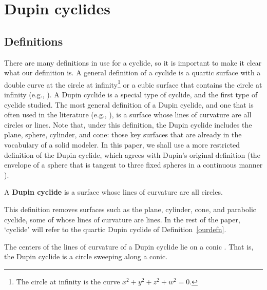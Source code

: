 \section{Dupin cyclides}
\label{sec-cy}

\subsection{Definitions}

There are many definitions in use for a cyclide,
so it is important to make it clear what our definition is.
A general definition of a cyclide is 
a quartic surface with a double curve at the circle at infinity\footnote{The
	circle at infinity is the curve $x^{2} + y^{2} + z^{2} + w^{2} = 0$.}
or a cubic surface that contains the circle at infinity
(e.g., \cite{F12,SOM47}). %
A Dupin cyclide is a special type of cyclide,
and the first type of cyclide studied.
The most general definition of a Dupin cyclide, 
and one that is often used in the literature (e.g., \cite{CDH89a,FISCH86}),
is a surface whose lines of curvature are all circles or lines.
Note that, under this definition, the Dupin cyclide includes 
the plane, sphere, cylinder, and cone: those key surfaces that are
already in the vocabulary of a solid modeler.
In this paper, we shall use a more restricted definition of the Dupin cyclide,
which agrees with Dupin's original definition 
(the envelope of a sphere
that is tangent to three fixed spheres in a continuous manner \cite{MAX68}).

\begin{defn2}
\label{ourdefn}
A {\bf Dupin cyclide} is a surface whose lines of curvature are all circles.
\end{defn2}

This definition removes surfaces such as the plane, cylinder, cone, and 
parabolic cyclide, some of whose lines of curvature are lines.
In the rest of the paper, `cyclide' will refer to the quartic Dupin cyclide
of Definition~\ref{ourdefn}.

\begin{rmk}
\label{rmk:conic}
The centers of the lines of curvature of a Dupin cyclide 
lie on a conic \cite{F12,H52}. 
That is, the Dupin cyclide is a circle sweeping along a conic.
\end{rmk}

